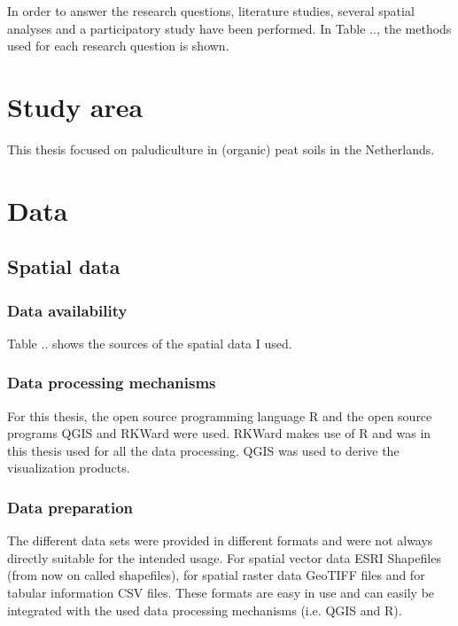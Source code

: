 \documentclass[a4paper,12pt]{scrbook}
\begin{document}
In order to answer the research questions, literature studies, several spatial analyses and a participatory study have been performed. In Table .., the methods used for each research question is shown. 

\section{Study area}

This thesis focused on paludiculture in (organic) peat soils in the Netherlands. 


\section{Data}

\subsection{Spatial data}

\subsubsection{Data availability}

Table .. shows the sources of the spatial data I used.

\subsubsection{Data processing mechanisms}
For this thesis, the open source programming language R and the open source programs \ac{QGIS} and RKWard were used. RKWard makes use of R and was in this thesis used for all the data processing. \ac{QGIS} was used to derive the visualization products.

\subsubsection{Data preparation}

The different data sets were provided in different formats and were not always directly suitable for the intended usage. For spatial vector data ESRI Shapefiles (from now on called shapefiles), for spatial raster data \ac{GeoTIFF} files and for tabular information \ac{CSV} files. These formats are easy in use and can easily be integrated with the used data processing mechanisms (i.e. \ac{QGIS} and R).
\end{document}
